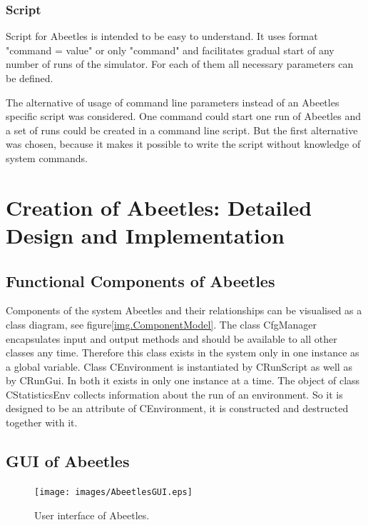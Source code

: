 \documentclass[a4paper,12pt]{report}
\begin{document}
  
\subsection {Script}

Script for Abeetles is intended to be easy to understand. It uses format
"command = value" or only "command" and facilitates gradual start of any number of runs of the simulator. For each of them all necessary parameters can be defined.

The alternative of usage of command line parameters instead of an Abeetles specific script was considered. One command could start one run of Abeetles and a set of runs could be created in a command line script. But the first alternative was chosen, because it makes it possible to write the script without knowledge of system commands.


\chapter{Creation of Abeetles: Detailed Design and Implementation}


\section{Functional Components of Abeetles}
Components of the system Abeetles and their relationships can be visualised as a class diagram, see figure\ref{img.ComponentModel}. The class CfgManager encapsulates input and output methods and should be available to all other classes any time. Therefore this class exists in the system only in one instance as a global variable. Class CEnvironment is instantiated by CRunScript as well as by CRunGui. In both it exists in only one instance at a time. The object of class CStatisticsEnv collects information about the run of an environment. So it is designed to be an attribute of CEnvironment, it is constructed and destructed together with it.


\section {GUI of Abeetles}
\begin{figure}
\begin{center}
  \texttt{[image: images/AbeetlesGUI.eps]}
  \caption{User interface of Abeetles.}
  \label{img.AbeetlesGUI}
\end{center}
\end{figure}
\end{document}
